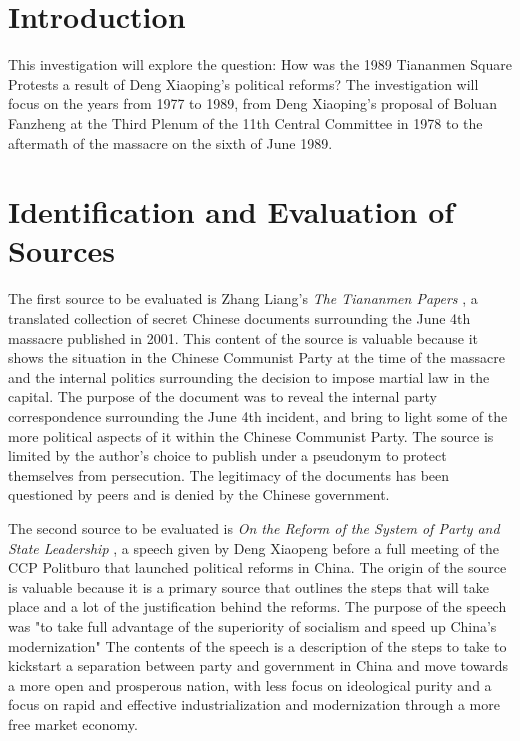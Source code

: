 \documentclass{paper}
\begin{document}
\insertTitlePage
\tableofcontents
\thispagestyle{empty}
\newpage
\setcounter{page}{1}
\doublespacing

\section{Introduction}
This investigation will explore the question: How was the 1989 Tiananmen Square Protests a result of Deng Xiaoping's political reforms? The investigation will focus on the years from 1977 to 1989, from Deng Xiaoping's proposal of Boluan Fanzheng at the Third Plenum of the 11th Central Committee in 1978 to the aftermath of the massacre on the sixth of June 1989.

\section{Identification and Evaluation of Sources}
The first source to be evaluated is Zhang Liang's \textit{The Tiananmen Papers} \autocite{tiananmen}, a translated collection of secret Chinese documents surrounding the June 4th massacre published in 2001.
This content of the source is valuable because it shows the situation in the Chinese Communist Party at the time of the massacre and the internal politics surrounding the decision to impose martial law in the capital.
The purpose of the document was to reveal the internal party correspondence surrounding the June 4th incident, and bring to light some of the more political aspects of it within the Chinese Communist Party.
The source is limited by the author's choice to publish under a pseudonym to protect themselves from persecution.
The legitimacy of the documents has been questioned by peers and is denied by the Chinese government.

The second source to be evaluated is \textit{On the Reform of the System of Party and State Leadership} \autocite{reforms}, a speech given by Deng Xiaopeng before a full meeting of the CCP Politburo that launched political reforms in China.
The origin of the source is valuable because it is a primary source that outlines the steps that will take place and a lot of the justification behind the reforms.
The purpose of the speech was "to take full advantage of the superiority of socialism and speed up China's modernization" The contents of the speech is a description of the steps to take to kickstart a separation between party and government in China and move towards a more open and prosperous nation, with less focus on ideological purity and a focus on rapid and effective industrialization and modernization through a more free market economy.
\end{document}

